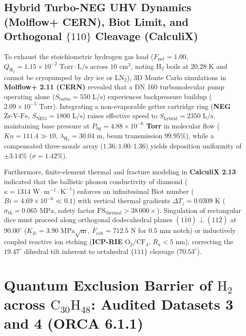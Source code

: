 \documentclass[10pt,twocolumn,a4paper]{article}
\begin{document}
\subsection{Hybrid Turbo-NEG UHV Dynamics (Molflow+ CERN), Biot Limit, and Orthogonal $\{110\}$ Cleavage (CalculiX)}
To exhaust the stoichiometric hydrogen gas load ($F_{\text{net}} = 1.00$, $Q_{\text{H}_2} = 1.15 \times 10^{-2}\text{ Torr}\cdot\text{L/s}$ across $10\text{ cm}^2$, noting $\text{H}_2$ boils at $20.28\text{ K}$ and cannot be cryopumped by dry ice or $\text{LN}_2$), 3D Monte Carlo simulations in \textbf{Molflow+ 2.11 (CERN)} \cite{Kersevan2009} revealed that a DN 160 turbomolecular pump operating alone ($S_{\text{turbo}} = 550\text{ L/s}$) experiences backpressure buildup ($2.09 \times 10^{-5}\text{ Torr}$). Integrating a non-evaporable getter cartridge ring (\textbf{NEG $\text{Zr-V-Fe}$}, $S_{\text{NEG}} = 1800\text{ L/s}$) raises effective speed to $S_{\text{hybrid}} = 2350\text{ L/s}$, maintaining base pressure at \textbf{$P_{\text{bg}} = 4.88 \times 10^{-6}$ Torr} in molecular flow (\textbf{$Kn = 111.4 \gg 10$}, $\lambda_{\text{H}_2} = 30.04\text{ m}$, beam transmission $99.95\%$), while a compensated three-nozzle array ($1.36 : 1.00 : 1.36$) yields deposition uniformity of $\pm 3.14\%$ ($\sigma = 1.42\%$).

Furthermore, finite-element thermal and fracture modeling in \textbf{CalculiX 2.13} \cite{Dhondt2018} indicated that the ballistic phonon conductivity of diamond ($\kappa = 1314\text{ W}\cdot\text{m}^{-1}\cdot\text{K}^{-1}$) enforces an infinitesimal Biot number (\textbf{$Bi = 4.69 \times 10^{-6} \ll 0.1$}) with vertical thermal gradients $\Delta T_z = 0.0309\text{ K}$ ($\sigma_{\text{th}} = 0.065\text{ MPa}$, safety factor $\text{FS}_{\text{thermal}} > 38\,000\times$). Singulation of rectangular dice must proceed along orthogonal dodecahedral planes $(1\bar{1}0) \perp (11\bar{2})$ at \textbf{$90.00^\circ$} ($K_{Ic} = 3.90\text{ MPa}\sqrt{\text{m}}$, $F_{\text{crit}} = 712.5\text{ N}$ for $0.5\text{ mm}$ notch) or inductively coupled reactive ion etching (\textbf{ICP-RIE} $\text{O}_2/\text{CF}_4$, $R_a < 5\text{ nm}$), correcting the $19.47^\circ$ dihedral tilt inherent to octahedral $\{111\}$ cleavage ($70.53^\circ$).

\section{Quantum Exclusion Barrier of $\text{H}_2$ across $\text{C}_{30}\text{H}_{48}$: Audited Datasets 3 and 4 (ORCA 6.1.1)}
\end{document}
